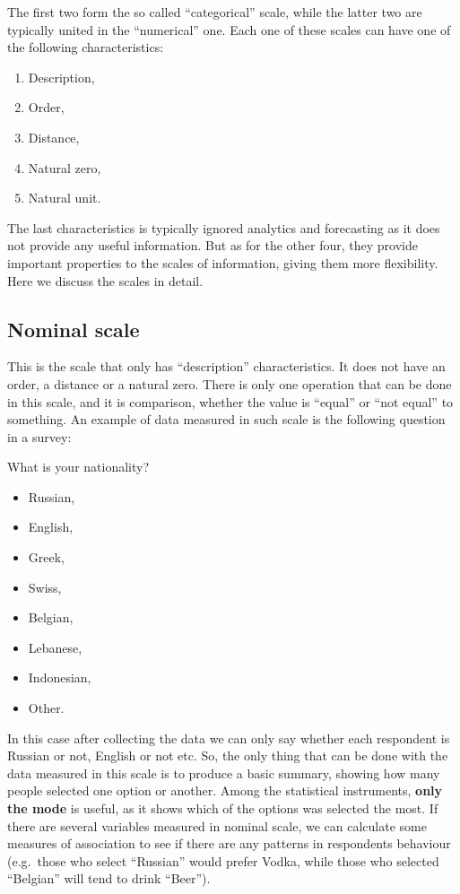 \documentclass[
]{book}
\providecommand{\tightlist}{%
  \setlength{\itemsep}{0pt}\setlength{\parskip}{0pt}}
\theoremstyle{definition}
\theoremstyle{definition}
\theoremstyle{definition}
\theoremstyle{definition}
\theoremstyle{remark}
\begin{document}
The first two form the so called ``categorical'' scale, while the latter two are typically united in the ``numerical'' one. Each one of these scales can have one of the following characteristics:

\begin{enumerate}
\def\labelenumi{\arabic{enumi}.}
\tightlist
\item
  Description,
\item
  Order,
\item
  Distance,
\item
  Natural zero,
\item
  Natural unit.
\end{enumerate}

The last characteristics is typically ignored analytics and forecasting as it does not provide any useful information. But as for the other four, they provide important properties to the scales of information, giving them more flexibility. Here we discuss the scales in detail.

\subsection{Nominal scale}\label{nominal-scale}

This is the scale that only has ``description'' characteristics. It does not have an order, a distance or a natural zero. There is only one operation that can be done in this scale, and it is comparison, whether the value is ``equal'' or ``not equal'' to something. An example of data measured in such scale is the following question in a survey:

What is your nationality?

\begin{itemize}
\tightlist
\item
  Russian,
\item
  English,
\item
  Greek,
\item
  Swiss,
\item
  Belgian,
\item
  Lebanese,
\item
  Indonesian,
\item
  Other.
\end{itemize}

In this case after collecting the data we can only say whether each respondent is Russian or not, English or not etc. So, the only thing that can be done with the data measured in this scale is to produce a basic summary, showing how many people selected one option or another. Among the statistical instruments, \textbf{only the mode} is useful, as it shows which of the options was selected the most. If there are several variables measured in nominal scale, we can calculate some measures of association to see if there are any patterns in respondents behaviour (e.g.~those who select ``Russian'' would prefer Vodka, while those who selected ``Belgian'' will tend to drink ``Beer'').
\end{document}
